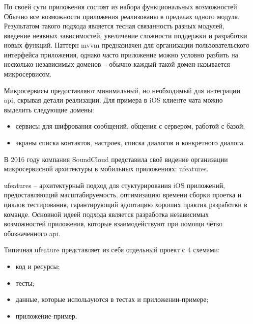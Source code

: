 \subsubsection{}
\label{sec:analysis:research:mobArch:ufeature}

По своей сути приложения состоят из набора функциональных возможностей. Обычно все возможности приложения реализованы в пределах одного модуля. Результатом такого подхода является тесная связанность разных модулей, введение неявных зависимостей, увеличение сложности поддержки и разработки новых функций. Паттерн \gls{mvvm} предназначен для организации пользовательского интерфейса приложения, однако часто приложение можно условно разбить на несколько независимых доменов -- обычно каждый такой домен называется микросервисом.

Микросервисы предоставляют минимальный, но необходимый для интеграции \gls{api}, скрывая детали реализации. Для примера в iOS клиенте чата можно выделить следующие домены:

\begin{itemize}
	\item сервисы для шифрования сообщений, общения с сервером, работой с базой;
	\item экраны списка контактов, настроек, списка диалогов и конкретного диалога.
\end{itemize}

В 2016 году компания SoundCloud представила своё видение организации микросервисной архитектуры в мобильных приложениях: \glspl{ufeature}.

\glspl{ufeature} -- архитектурный подход для стуктурирования iOS приложений, предоставляющий масштабируемость, оптимизацию времени сборки проетка и циклов тестирования, гарантирующий адоптацию хороших практик разработки в команде. Основной идеей подхода является разработка независимых возможностей приложения, которые взаимодействуют при помощи чётко обозначенного \gls{api}\cite{soundcloud:ufeature}.

Типичная \gls{ufeature} представляет из себя отдельный проект с 4 схемами:

\begin{itemize}
	\item код и ресурсы;
	\item тесты;
	\item данные, которые используются в тестах и приложении-примере;
	\item приложение-пример.
\end{itemize}

